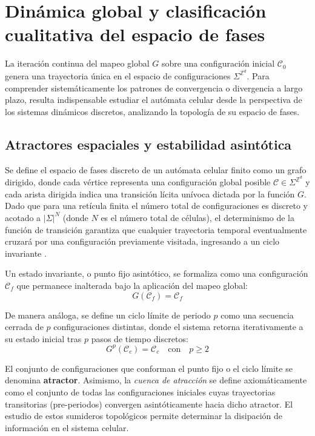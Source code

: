 \section{Dinámica global y clasificación cualitativa del espacio de fases}
\label{sec:dinamica_global}

La iteración continua del mapeo global $G$ sobre una configuración inicial $\mathcal{C}_0$ genera una trayectoria única en el espacio de configuraciones $\Sigma^{\mathbb{Z}^d}$. Para comprender sistemáticamente los patrones de convergencia o divergencia a largo plazo, resulta indispensable estudiar el autómata celular desde la perspectiva de los sistemas dinámicos discretos, analizando la topología de su espacio de fases.

\subsection{Atractores espaciales y estabilidad asintótica}

Se define el espacio de fases discreto de un autómata celular finito como un grafo dirigido, donde cada vértice representa una configuración global posible $\mathcal{C} \in \Sigma^{\mathbb{Z}^d}$ y cada arista dirigida indica una transición lícita unívoca dictada por la función $G$. Dado que para una retícula finita el número total de configuraciones es discreto y acotado a $|\Sigma|^N$ (donde $N$ es el número total de células), el determinismo de la función de transición garantiza que cualquier trayectoria temporal eventualmente cruzará por una configuración previamente visitada, ingresando a un ciclo invariante \cite{Wuensche1998}.

Un estado invariante, o punto fijo asintótico, se formaliza como una configuración $\mathcal{C}_f$ que permanece inalterada bajo la aplicación del mapeo global:
\begin{equation}
    G(\mathcal{C}_f) = \mathcal{C}_f
\end{equation}

De manera análoga, se define un ciclo límite de periodo $p$ como una secuencia cerrada de $p$ configuraciones distintas, donde el sistema retorna iterativamente a su estado inicial tras $p$ pasos de tiempo discretos:
\begin{equation}
    G^p(\mathcal{C}_c) = \mathcal{C}_c \quad \text{con} \quad p \geq 2
\end{equation}

El conjunto de configuraciones que conforman el punto fijo o el ciclo límite se denomina \textbf{atractor}. Asimismo, la \textit{cuenca de atracción} se define axiomáticamente como el conjunto de todas las configuraciones iniciales cuyas trayectorias transitorias (pre-periodos) convergen asintóticamente hacia dicho atractor. El estudio de estos sumideros topológicos permite determinar la disipación de información en el sistema celular.

